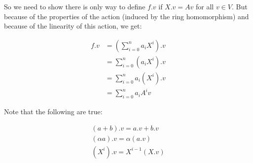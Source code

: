 
So we need to show there is only way to define $f.v$ if $X.v=Av$ for all $v \in V$. But because of the properties of the action (induced by the ring homomorphism) and because of the linearity of this action, we get:

\begin{align*}
f.v &= (\sum_{i=0}^n a_i X^i).v \\
&= \sum_{i=0}^n (a_i X^i).v \\
&= \sum_{i=0}^n a_i (X^i).v \\
&= \sum_{i=0}^n a_i A^iv
\end{align*}

Note that the following are true:

\begin{align*}
(a+b).v = a.v + b.v \\
(\alpha a).v = \alpha (a.v) \\
(X^i).v = X^{i-1}(X.v) \\
\end{align*}